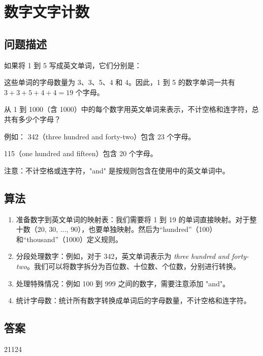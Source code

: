 \section{数字文字计数}
\subsection{问题描述}
\begin{tcolorbox}
	如果将 1 到 5 写成英文单词，它们分别是：

	\begin{itemize}
	\end{itemize}
	这些单词的字母数量为 3、3、5、4 和 4。因此，1 到 5 的数字单词一共有
	$ 3 + 3 + 5 + 4 + 4 = 19 $
	个字母。

	从 1 到 1000（含 1000）中的每个数字用英文单词来表示，不计空格和连字符，总共有多少个字母？

	例如：
	342（three hundred and forty-two）包含 23 个字母。

	115（one hundred and fifteen）包含 20 个字母。

	注意：不计空格或连字符，"and" 是按规则包含在使用中的英文单词中。
\end{tcolorbox}

\subsection{算法}
\begin{enumerate}
	\item 准备数字到英文单词的映射表：我们需要将 1 到 19 的单词直接映射。对于整十数（20, 30, ..., 90），也要单独映射。然后为“hundred”（100）和“thousand”（1000）定义规则。
	\item 分段处理数字：例如，对于 342，英文单词表示为 \textit{three hundred and forty-two}。我们可以将数字拆分为百位数、十位数、个位数，分别进行转换。
	\item 处理特殊情况：例如 100 到 999 之间的数字，需要注意添加 "and"。
	\item 统计字母数：统计所有数字转换成单词后的字母数量，不计空格和连字符。
\end{enumerate}

\subsection{答案}
21124
